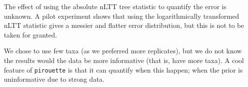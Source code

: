 The effect of using the absolute nLTT tree statistic to quantify the error
is unknown. A pilot experiment  shows that
using the logarithmically transformed nLTT statistic gives a messier and
flatter error distribution, but this is not to be taken for granted.

We chose to use few taxa (as we preferred more replicates), but we do not
know the results would the data be more informative (that is, have more taxa).
A cool feature of \verb;pirouette; is that it can quantify when this happen;
when the prior is uninformative due to strong data.